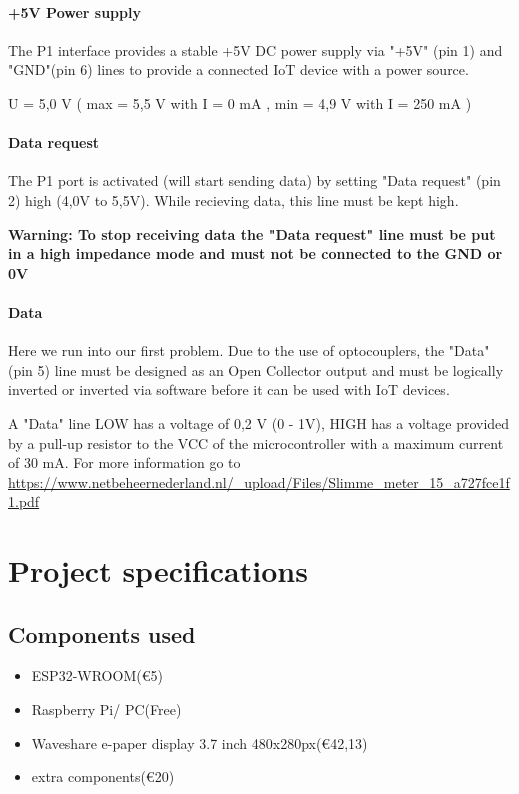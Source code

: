 \documentclass[a4paper,twoside, 12pt]{report}
\theoremstyle{break}
\begin{document}
\subsubsection{+5V Power supply}
The P1 interface provides a stable +5V DC power supply via "+5V" (pin 1) and "GND"(pin 6) lines to provide a connected IoT device with a power source.

U = 5,0 V ( max = 5,5 V with I = 0 mA , min = 4,9 V with I = 250 mA )

\subsubsection{Data request}
The P1 port is activated (will start sending data) by setting "Data request" (pin 2) high (4,0V to 5,5V). While recieving data, this line must be kept high.

\textbf{Warning: To stop receiving data the "Data request" line must be put in a high impedance mode and must not be connected to the GND or 0V}

\subsubsection{Data}
Here we run into our first problem. Due to the use of optocouplers, the "Data" (pin 5) line must be designed as an Open Collector output and must be logically inverted or inverted via software before it can be used with IoT devices.

A "Data" line LOW has a voltage of 0,2 V (0 - 1V), HIGH has a voltage provided by a pull-up resistor to the VCC of the microcontroller with a maximum current of 30 mA.
For more information go to \url{https://www.netbeheernederland.nl/_upload/Files/Slimme_meter_15_a727fce1f1.pdf}
\vfill
\eject
\chapter{Project specifications}
\section{Components used}
\begin{itemize}
	\item ESP32-WROOM\tabto{11cm}(€5)
	\item Raspberry Pi/ PC\tabto{11cm}(Free)
	\item Waveshare e-paper display 3.7 inch 480x280px\tabto{11cm}(€42,13)
	\item extra components\tabto{11cm}(€20)
	
\end{itemize}
\end{document}
